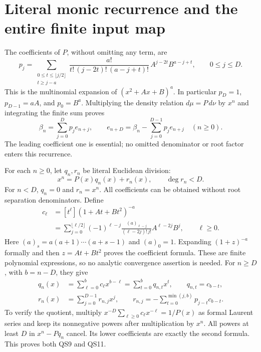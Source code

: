 \documentclass[11pt]{article}
\begin{document}
\section{Literal monic recurrence and the entire finite input map}

The coefficients of \(P\), without omitting any term, are
\begin{equation}\tag{QS7}
 p_j=\sum_{\substack{0\le t\le\lfloor j/2\rfloor\\t\ge j-a}}
     \frac{a!}{t!\,(j-2t)!\,(a-j+t)!}\,
          A^{j-2t}B^{a-j+t},\qquad 0\le j\le D.
\end{equation}
This is the multinomial expansion of
\((x^2+Ax+B)^a\). In particular \(p_D=1\),
\(p_{D-1}=aA\), and \(p_0=B^a\).
Multiplying the density relation \(d\mu=P\,d\nu\) by \(x^n\)
and integrating the finite sum proves
\begin{equation}\tag{QS8}
 \beta_n=\sum_{j=0}^Dp_je_{n+j},\qquad
 e_{n+D}=\beta_n-\sum_{j=0}^{D-1}p_je_{n+j}
                  \quad(n\ge0).
\end{equation}
The leading coefficient one is essential; no omitted denominator
or root factor enters this recurrence.

For each \(n\ge0\), let \(q_n,r_n\) be literal Euclidean division:
\begin{equation}\tag{QS9}
 x^n=P(x)q_n(x)+r_n(x),\qquad \deg r_n<D.
\end{equation}
For \(n<D\), \(q_n=0\) and \(r_n=x^n\).
All coefficients can be obtained without root separation
denominators. Define
\begin{equation}\tag{QS10}
\begin{aligned}
 c_\ell
 &=[t^\ell](1+At+Bt^2)^{-a}\\
 &=\sum_{j=0}^{\lfloor\ell/2\rfloor}
   (-1)^{\ell-j}\frac{(a)_{\ell-j}}{(\ell-2j)!\,j!}
                     A^{\ell-2j}B^j,\qquad \ell\ge0 .
\end{aligned}
\end{equation}
Here \((a)_s=a(a+1)\cdots(a+s-1)\) and \((a)_0=1\).
Expanding \((1+z)^{-a}\) formally and then \(z=At+Bt^2\)
proves the coefficient formula. These are finite polynomial
expressions, so no analytic convergence assertion is needed.
For \(n\ge D\), with \(b=n-D\), they give
\begin{equation}\tag{QS11}
\begin{aligned}
 q_n(x)&=\sum_{\ell=0}^{b}c_\ell x^{b-\ell}
         =\sum_{t=0}^{b}q_{n,t}x^t,\qquad q_{n,t}=c_{b-t},\\
 r_n(x)&=\sum_{j=0}^{D-1}r_{n,j}x^j,\qquad
 r_{n,j}=-\sum_{t=0}^{\min(j,b)}p_{j-t}c_{b-t}.
\end{aligned}
\end{equation}
To verify the quotient, multiply
\(x^{-D}\sum_{\ell\ge0}c_\ell x^{-\ell}=1/P(x)\)
as formal Laurent series and keep its nonnegative powers
after multiplication by \(x^n\). All powers at least \(D\)
in \(x^n-Pq_n\) cancel. Its lower coefficients are exactly
the second formula. This proves both QS9 and QS11.
\end{document}
